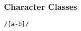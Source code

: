 \begin{frame}

\frametitle{Character Classes}

\vspace{\fill}

\begin{center}

\Large\texttt{/[a-b]/}

\end{center}

\vspace{\fill}



\vspace{\fill}

\end{frame}
